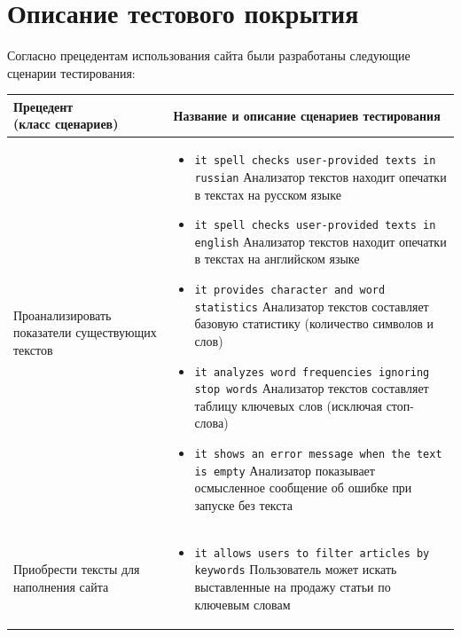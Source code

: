 \documentclass[listings]{labreport}
\begin{document}
\newpage
\section*{Описание тестового покрытия}

Согласно прецедентам использования сайта были разработаны следующие сценарии тестирования:

\renewcommand{\arraystretch}{1.5}
\noindent
\begin{longtable}{L{4.5cm} L{12cm}}
\hline
\textbf{Прецедент \newline (класс сценариев)} & \textbf{Название и описание сценариев тестирования} \\\hline
Проанализировать показатели существующих текстов
   &
\begin{itemize}[noitemsep,topsep=0em,leftmargin=*]
 \item {\small\verb|it spell checks user-provided texts in russian|}\newline
   Анализатор текстов находит опечатки в текстах на русском языке
 \item {\small\verb|it spell checks user-provided texts in english|}\newline
   Анализатор текстов находит опечатки в текстах на английском языке
 \item {\small\verb|it provides character and word statistics|}\newline
   Анализатор текстов составляет базовую статистику (количество символов и слов)
 \item {\small\verb|it analyzes word frequencies ignoring stop words|}\newline
   Анализатор текстов составляет таблицу ключевых слов (исключая стоп-слова)
 \item {\small\verb|it shows an error message when the text is empty|}\newline
   Анализатор показывает осмысленное сообщение об ошибке при запуске без текста
\end{itemize}
  \\\hline
Приобрести тексты для наполнения сайта
   &
\begin{itemize}[noitemsep,topsep=0em,leftmargin=*]
 \item {\small\verb|it allows users to filter articles by keywords|}\newline
   Пользователь может искать выставленные на продажу статьи по ключевым словам

\end{itemize}
\end{longtable}
\end{document}
